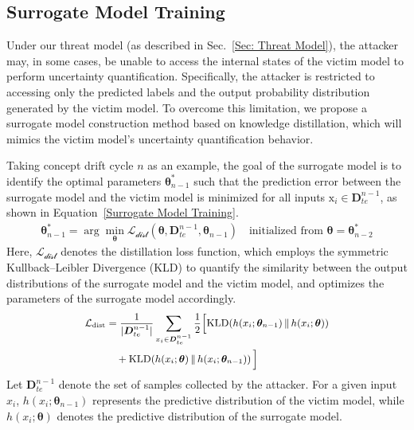 \subsection{Surrogate Model Training}
Under our threat model (as described in Sec.~\ref{Sec: Threat Model}), the attacker may, in some cases, be unable to access the internal states of the victim model to perform uncertainty quantification.
Specifically, the attacker is restricted to accessing only the predicted labels and the output probability distribution generated by the victim model.
To overcome this limitation, we propose a surrogate model construction method based on knowledge distillation, which will mimics the victim model's uncertainty quantification behavior.

Taking concept drift cycle $n$ as an example, the goal of the surrogate model is to identify the optimal parameters $\bm{\theta}_{n-1}^{*}$ such that the prediction error between the surrogate model and the victim model is minimized for all inputs $\bm{\mathrm{x}}_{i} \in \bm{D}_{te}^{n-1}$, as shown in Equation~\ref{Surrogate Model Training}.
\begin{equation}
	\begin{aligned}
		\bm{\theta}_{n-1}^{*} = \arg\min_{\bm{\theta}} \mathcal{L_{\text{dist}}} \left( \bm{\theta}, \bm{D}_{te}^{n-1} , \bm{\theta}_{n-1} \right)
		\quad \text{initialized from } \bm{\theta} = \bm{\theta}^{*}_{n-2}
	\end{aligned}
	\label{Surrogate Model Training}
\end{equation}
Here, $\mathcal{L_{\text{dist}}}$ denotes the distillation loss function, which employs the symmetric Kullback–Leibler Divergence (KLD) to quantify the similarity between the output distributions of the surrogate model and the victim model, and optimizes the parameters of the surrogate model accordingly.
\begin{equation}
	\small
	\begin{aligned}
		\mathcal{L_{\text{dist}}} 
		&= \frac{1}{|\bm{D}_{te}^{n-1}|} \sum_{x_i \in \bm{D}_{te}^{n-1}} \frac{1}{2} \Big[ 
		\mathrm{KLD}\!\left(h(x_i; \bm{\theta}_{n-1})\,\|\,h(x_i; \bm{\theta} )\right) \\
		&\quad + \mathrm{KLD}\!\left(h(x_i; \bm{\theta})\,\|\,h(x_i; \bm{\theta}_{n-1})\right) \Big]
	\end{aligned}
	\label{KL-loss}
\end{equation}
Let $\bm{D}_{te}^{n-1}$ denote the set of samples collected by the attacker.
For a given input $x_i$, $h(x_i; \bm{\theta}_{n-1})$ represents the predictive distribution of the victim model, while $h(x_i; \bm{\theta})$ denotes the predictive distribution of the surrogate model.
